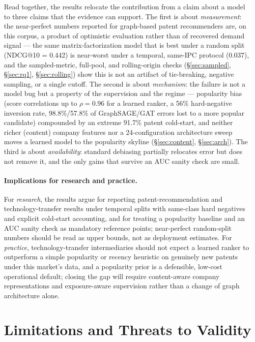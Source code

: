 \documentclass[preprint,12pt]{elsarticle}
\begin{document}
Read together, the results relocate the contribution from a claim about a model to
three claims that the evidence can support. The first is about \emph{measurement}: the
near-perfect numbers reported for graph-based patent recommenders are, on this corpus,
a product of optimistic evaluation rather than of recovered demand signal --- the same
matrix-factorization model that is best under a random split (NDCG@10 = 0.442) is
near-worst under a temporal, same-IPC protocol (0.037), and the sampled-metric,
full-pool, and rolling-origin checks (\S\ref{sec:sampled}, \S\ref{sec:rq1},
\S\ref{sec:rolling}) show this is not an artifact of tie-breaking, negative sampling,
or a single cutoff. The second is about \emph{mechanism}: the failure is not a model
bug but a property of the supervision and the regime --- popularity bias (score
correlations up to $\rho = 0.96$ for a learned ranker, a 56\% hard-negative inversion
rate, 98.8\%/57.8\% of GraphSAGE/GAT errors lost to a more popular candidate) compounded
by an extreme 91.7\% patent cold-start, and neither richer (content) company features
nor a 24-configuration architecture sweep moves a learned model to the popularity
skyline (\S\ref{sec:content}, \S\ref{sec:arch}). The third is about \emph{availability}:
standard debiasing partially relocates error but does not remove it, and the only gains
that survive an AUC sanity check are small.

\paragraph{Implications for research and practice.} For \emph{research},
the results argue for reporting patent-recommendation and technology-transfer
results under temporal splits with same-class hard negatives and explicit
cold-start accounting, and for treating a popularity baseline and an AUC sanity
check as mandatory reference points; near-perfect random-split numbers should be
read as upper bounds, not as deployment estimates. For \emph{practice},
technology-transfer intermediaries should not expect a learned ranker to
outperform a simple popularity or recency heuristic on genuinely new patents
under this market's data, and a popularity prior is a defensible, low-cost
operational default; closing the gap will require content-aware company
representations and exposure-aware supervision rather than a change of graph
architecture alone.

\section{Limitations and Threats to Validity}
\label{sec:limitations}
\end{document}

